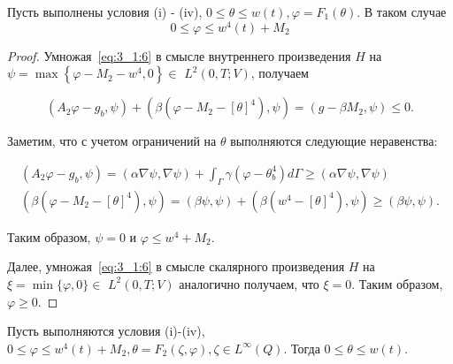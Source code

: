 \begin{lemma}
    \label{lm:3_1:1}
Пусть выполнены условия (i) - (iv), $0 \leq \theta \leq w(t), \varphi=F_{1}(\theta)$.
В таком случае
\begin{equation}
    \label{eq:3_1:8}
    0 \leq \varphi \leq w^{4}(t)+M_{2}
\end{equation}
\end{lemma}
\begin{proof}
Умножая~\eqref{eq:3_1:6} в смысле внутреннего произведения $H$ на
$\psi=\max \left\{\varphi-M_{2}-w^{4}, 0\right\} \in$ $L^{2}(0, T ; V)$, получаем

\[
    \left(A_{2} \varphi-g_{b}, \psi\right)+\left(\beta\left(\varphi-M_{2}-[\theta]^{4}\right),
    \psi\right)=\left(g-\beta M_{2}, \psi\right) \leq 0.
\]


Заметим, что с учетом ограничений на $\theta$ выполняются следующие неравенства:

\[
    \begin{gathered}
        \left(A_{2} \varphi-g_{b}, \psi\right)=(\alpha \nabla \psi, \nabla \psi)+
        \int_{\Gamma} \gamma\left(\varphi-\theta_{b}^{4}\right) d \Gamma
        \geq (\alpha \nabla \psi, \nabla \psi) \\
        \left(\beta\left(\varphi-M_{2}-[\theta]^{4}\right), \psi\right)=
        (\beta \psi, \psi)+\left(\beta\left(w^{4}-[\theta]^{4}\right), \psi\right)
        \geq(\beta \psi, \psi).
    \end{gathered}
\]


Таким образом, $\psi=0$ и $\varphi \leq w^{4}+M_{2}$.

Далее, умножая~\eqref{eq:3_1:6} в смысле скалярного произведения $H$
на $\xi=\min \{\varphi, 0\} \in$ $L^{2}(0, T ; V) $ аналогично получаем,
что $\xi=0$.
Таким образом, $\varphi\geq 0$.
\end{proof}
\begin{lemma}
    \label{lm:3_1:2}
Пусть выполняются условия (i)-(iv), $0 \leq \varphi \leq w^{4}(t)+M_{2},
    \theta=F_{2}(\zeta, \varphi), \zeta \in L^{\infty}(Q)$.
Тогда $0 \leq \theta \leq w(t)$.
\end{lemma}
